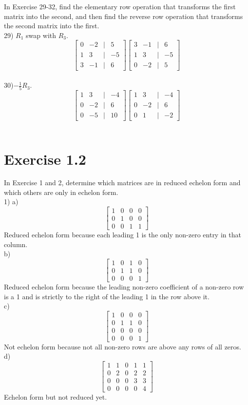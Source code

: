 \documentclass[]{article}
\begin{document}
In Exercise 29-32, find the elementary row operation that transforms the first matrix into the second, and then find the reverse row operation that transforms the second matrix into the first.\\

29) $R_1$ swap with $R_3$.\\
\[
\begin{bmatrix}
0&-2&|&5\\
1&3&|&-5\\
3&-1&|&6
\end{bmatrix}
\begin{bmatrix}
3&-1&|&6\\
1&3&|&-5\\
0&-2&|&5
\end{bmatrix}
\]\\


30)$-\frac{1}{5}R_3$.\\
\[
\begin{bmatrix}
1&3&|&-4\\
0&-2&|&6\\
0&-5&|&10
\end{bmatrix}
\begin{bmatrix}
1&3&|&-4\\
0&-2&|&6\\
0&1&|&-2
\end{bmatrix}
\]\\

\section{Exercise 1.2}

In Exercise 1 and 2, determine which matrices are in reduced echelon form and which others are only in echelon form.\\

1) a) \[
\begin{bmatrix}
1&0&0&0\\
0&1&0&0\\
0&0&1&1
\end{bmatrix}
\]
Reduced echelon form because each leading 1 is the only non-zero entry in that column.\\

b) \[
\begin{bmatrix}
1&0&1&0\\
0&1&1&0\\
0&0&0&1
\end{bmatrix}
\]
Reduced echelon form because the leading non-zero coefficient of a non-zero row is a 1 and is strictly to the right of the leading 1 in the row above it.\\

c) \[
\begin{bmatrix}
1&0&0&0\\
0&1&1&0\\
0&0&0&0\\
0&0&0&1
\end{bmatrix}
\]
Not echelon form because not all non-zero rows are above any rows of all zeros.\\

d) \[
\begin{bmatrix}
1&1&0&1&1\\
0&2&0&2&2\\
0&0&0&3&3\\
0&0&0&0&4
\end{bmatrix}
\]
Echelon form but not reduced yet.\\
\end{document}
